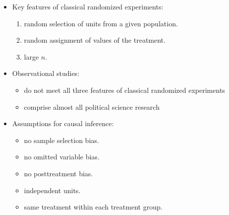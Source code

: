 \documentclass[20pt,landscape,pdftex]{foils}
\begin{document}
\begin{itemize}
\item Key features of classical randomized experiments:\pause
  \begin{enumerate}
  \item random selection of units from a given population.\pause
  \item random assignment of values of the treatment.\pause
  \item large $n$.\pause
  \end{enumerate}
\item Observational studies:\pause
  \begin{itemize}
  \item do not meet all three features of classical randomized
    experiments\pause
  \item comprise almost all political science research
  \end{itemize}

\item Assumptions for causal inference:\pause
  \begin{itemize}
  \item no sample selection bias.\pause
  \item no omitted variable bias.\pause
  \item no posttreatment bias.\pause
  \item independent units.\pause
  \item same treatment within each treatment group.\pause
  \end{itemize}
\end{itemize}
\end{document}
